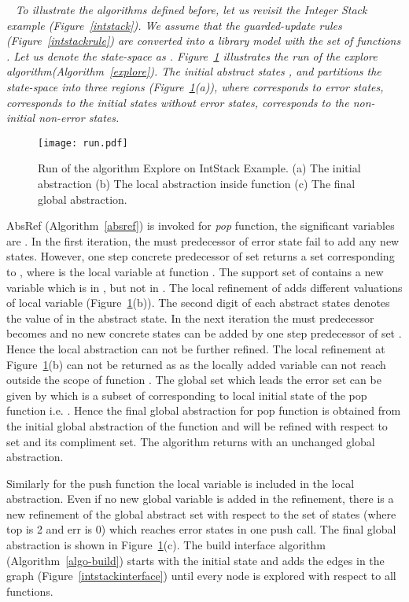 \documentclass{llncs}
\begin{document}
\begin{example} 
~\em
To illustrate the algorithms defined before, let us revisit the Integer Stack example (Figure~\ref{intstack}).
We assume that the guarded-update rules (Figure~\ref{intstackrule}) are converted into a 
library model with the set of functions .
Let us denote the state-space as .
Figure~\ref{fig-run} illustrates the run of the explore algorithm(Algorithm~\ref{explore}).
The initial abstract states ,  and  partitions the state-space  into three regions
(Figure~\ref{fig-run}(a)), where  corresponds to error states,
 corresponds to the initial states without error states,  corresponds to the non-initial non-error states. 
\begin{figure}[htb]
\centering
\texttt{[image: run.pdf]}
\caption{Run of the algorithm Explore on IntStack Example. (a) The initial abstraction (b) The local
abstraction inside function (c) The final global abstraction.}
\label{fig-run}
\end{figure}
AbsRef (Algorithm~\ref{absref}) is invoked for {\em pop} function, the significant variables are
.
In the first iteration, the must predecessor  of error state  fail to add any new states. 
However, one step concrete predecessor of set  returns a set   
corresponding to , where  is the local variable  at function .
The support set of  contains a new variable  which is in , but not  in 
. 
The local refinement of  adds different valuations of local variable  (Figure~\ref{fig-run}(b)). 
The second digit of each abstract states denotes the value of  in the abstract state.
In the next iteration the must predecessor  becomes  and no new concrete states can be added by one step predecessor of set .
Hence the local abstraction  can not be further refined.
The local refinement at Figure~\ref{fig-run}(b) can not be returned as as  the locally added variable  can not reach outside the scope of function .
The global set which leads the error set can be given by  which is a subset of  corresponding to local initial state  of the pop function i.e. .
Hence the final global abstraction  for pop function is obtained from the initial 
global abstraction  of the function and will be refined with respect to set  and its 
compliment set.
The algorithm returns with an unchanged global abstraction. 

Similarly for the push function  the local variable  is included in the local abstraction.
Even if no new global variable is added in the refinement,  there is a new refinement of the global
abstract set  with respect to the set of states (where top is 2 and err is 0) which reaches error 
states in one push call. 
The final global abstraction is shown in Figure~\ref{fig-run}(c).
The build interface algorithm (Algorithm~\ref{algo-build}) starts with the initial state  
and adds the edges in the graph (Figure~\ref{intstackinterface}) until every node is explored with 
respect to all functions. 
\end{example}
\end{document}
